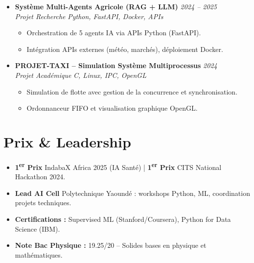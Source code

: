 \documentclass[a4paper,11pt]{article}
\begin{document}
\begin{itemize}[leftmargin=*, label={-}]
\item \textbf{Système Multi-Agents Agricole (RAG + LLM)} \hfill \textit{2024 -- 2025} \\
\textit{Projet Recherche} \hfill \textit{Python, FastAPI, Docker, APIs}
\vspace{-2pt}
    \begin{itemize}[leftmargin=0.4cm, nosep, label=\tiny$\bullet$]
        \item \small{Orchestration de 5 agents IA via APIs Python (FastAPI).}
        \item \small{Intégration APIs externes (météo, marchés), déploiement Docker.}
    \end{itemize}
\vspace{3pt}

\item \textbf{PROJET-TAXI -- Simulation Système Multiprocessus} \hfill \textit{2024} \\
\textit{Projet Académique} \hfill \textit{C, Linux, IPC, OpenGL}
\vspace{-2pt}
    \begin{itemize}[leftmargin=0.4cm, nosep, label=\tiny$\bullet$]
        \item \small{Simulation de flotte avec gestion de la concurrence et synchronisation.}
        \item \small{Ordonnanceur FIFO et visualisation graphique OpenGL.}
    \end{itemize}
\vspace{3pt}

\end{itemize}

\section{Prix \& Leadership}
\begin{itemize}[leftmargin=*, label=\tiny$\bullet$, nosep]
    \item \small{\textbf{1\textsuperscript{er} Prix} IndabaX Africa 2025 (IA Santé) | \textbf{1\textsuperscript{er} Prix} CITS National Hackathon 2024.}
    \item \small{\textbf{Lead AI Cell} Polytechnique Yaoundé : workshops Python, ML, coordination projets techniques.}
    \item \small{\textbf{Certifications :} Supervised ML (Stanford/Coursera), Python for Data Science (IBM).}
    \item \small{\textbf{Note Bac Physique :} 19.25/20 -- Solides bases en physique et mathématiques.}
\end{itemize}
\end{document}
